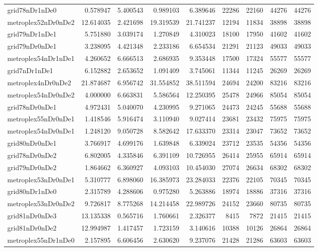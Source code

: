 \begin{longtable}{|l|r|r|r|r|r|r|r|r|}
grid78nDr1nDe0 & 0.578947 & 5.400543 & 0.989103 & 6.389646 & 22286 & 22160 & 44276 & 44276 \\
metroplex52nDr0nDe2 & 12.614035 & 2.421698 & 19.319539 & 21.741237 & 12194 & 11834 & 38898 & 38898 \\
grid79nDr1nDe1 & 5.751880 & 3.039174 & 1.270849 & 4.310023 & 18100 & 17950 & 41602 & 41602 \\
grid79nDr0nDe1 & 3.238095 & 4.421348 & 2.233186 & 6.654534 & 21291 & 21123 & 49033 & 49033 \\
metroplex54nDr1nDe1 & 4.260652 & 6.666513 & 2.686935 & 9.353448 & 17500 & 17324 & 55577 & 55577 \\
grid7nDr1nDe1 & 6.152882 & 2.653652 & 1.091409 & 3.745061 & 11344 & 11245 & 26269 & 26269 \\
metroplex4nDr0nDe2 & 21.874687 & 6.956742 & 31.554852 & 38.511594 & 24694 & 24200 & 83216 & 83216 \\
metroplex54nDr0nDe2 & 4.000000 & 6.663831 & 5.586564 & 12.250395 & 25478 & 24966 & 85054 & 85054 \\
grid78nDr0nDe1 & 4.972431 & 5.040070 & 4.230995 & 9.271065 & 24473 & 24245 & 55688 & 55688 \\
metroplex55nDr0nDe1 & 1.418546 & 5.916474 & 3.110940 & 9.027414 & 23681 & 23432 & 75975 & 75975 \\
metroplex54nDr0nDe1 & 1.248120 & 9.050728 & 8.582642 & 17.633370 & 23314 & 23047 & 73652 & 73652 \\
grid80nDr0nDe1 & 3.766917 & 4.699176 & 1.639848 & 6.339024 & 23712 & 23535 & 54356 & 54356 \\
grid78nDr0nDe2 & 6.802005 & 4.335846 & 6.391109 & 10.726955 & 26414 & 25955 & 65914 & 65914 \\
grid79nDr0nDe2 & 1.864662 & 6.360927 & 4.093103 & 10.454030 & 27074 & 26634 & 68302 & 68302 \\
metroplex53nDr0nDe1 & 5.310777 & 6.898060 & 16.385973 & 23.284033 & 22376 & 22105 & 70345 & 70345 \\
grid80nDr1nDe0 & 2.315789 & 4.288606 & 0.975280 & 5.263886 & 18974 & 18886 & 37316 & 37316 \\
metroplex53nDr0nDe2 & 9.726817 & 8.775268 & 14.214458 & 22.989726 & 24152 & 23660 & 80735 & 80735 \\
grid81nDr0nDe3 & 13.135338 & 0.565716 & 1.760661 & 2.326377 & 8415 & 7872 & 21415 & 21415 \\
grid81nDr0nDe2 & 12.994987 & 1.417457 & 1.723159 & 3.140616 & 10388 & 10126 & 26864 & 26864 \\
metroplex55nDr1nDe0 & 2.157895 & 6.606456 & 2.630620 & 9.237076 & 21428 & 21286 & 63603 & 63603 \\

\end{longtable}
